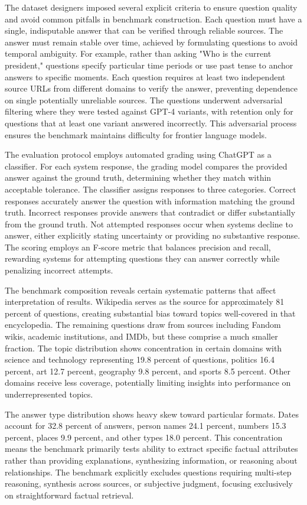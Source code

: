 The dataset designers imposed several explicit criteria to ensure question quality and avoid common pitfalls in benchmark construction. Each question must have a single, indisputable answer that can be verified through reliable sources. The answer must remain stable over time, achieved by formulating questions to avoid temporal ambiguity. For example, rather than asking "Who is the current president," questions specify particular time periods or use past tense to anchor answers to specific moments. Each question requires at least two independent source URLs from different domains to verify the answer, preventing dependence on single potentially unreliable sources. The questions underwent adversarial filtering where they were tested against GPT-4 variants, with retention only for questions that at least one variant answered incorrectly. This adversarial process ensures the benchmark maintains difficulty for frontier language models.

The evaluation protocol employs automated grading using ChatGPT as a classifier. For each system response, the grading model compares the provided answer against the ground truth, determining whether they match within acceptable tolerance. The classifier assigns responses to three categories. Correct responses accurately answer the question with information matching the ground truth. Incorrect responses provide answers that contradict or differ substantially from the ground truth. Not attempted responses occur when systems decline to answer, either explicitly stating uncertainty or providing no substantive response. The scoring employs an F-score metric that balances precision and recall, rewarding systems for attempting questions they can answer correctly while penalizing incorrect attempts.

The benchmark composition reveals certain systematic patterns that affect interpretation of results. Wikipedia serves as the source for approximately 81 percent of questions, creating substantial bias toward topics well-covered in that encyclopedia. The remaining questions draw from sources including Fandom wikis, academic institutions, and IMDb, but these comprise a much smaller fraction. The topic distribution shows concentration in certain domains with science and technology representing 19.8 percent of questions, politics 16.4 percent, art 12.7 percent, geography 9.8 percent, and sports 8.5 percent. Other domains receive less coverage, potentially limiting insights into performance on underrepresented topics.

The answer type distribution shows heavy skew toward particular formats. Dates account for 32.8 percent of answers, person names 24.1 percent, numbers 15.3 percent, places 9.9 percent, and other types 18.0 percent. This concentration means the benchmark primarily tests ability to extract specific factual attributes rather than providing explanations, synthesizing information, or reasoning about relationships. The benchmark explicitly excludes questions requiring multi-step reasoning, synthesis across sources, or subjective judgment, focusing exclusively on straightforward factual retrieval.

